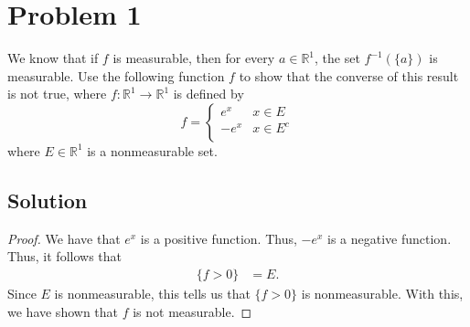 \documentclass[10pt,a4paper]{article}
\author{Jeremiah Givens}
\theoremstyle{theorem}
\theoremstyle{definition}
\begin{document}
\section*{Problem 1}
We know that if $f$ is measurable, then for every $a \in \mathbb{R}^1$, the set $f^{-1}(\{a\})$ is measurable. Use the following function $f$ to show that the converse of this result is not true, where $f: \mathbb{R}^1 \to \mathbb{R}^1$ is defined by
\[   f = \left\{
\begin{array}{ll}
      e^x & x \in E \\
      -e^x & x \in E^c \\
\end{array} 
\right. \]
where $E \in \mathbb{R}^1$ is a nonmeasurable set.

\subsection*{Solution}
\begin{proof}
We have that $e^x$ is a positive function. Thus, $-e^x$ is a negative function. Thus, it follows that
\begin{align*}
\{f > 0\} &= E.
\end{align*}
Since $E$ is nonmeasurable, this tells us that $\{f > 0\}$ is nonmeasurable. With this, we have shown that $f$ is not measurable.
\end{proof}
\end{document}
